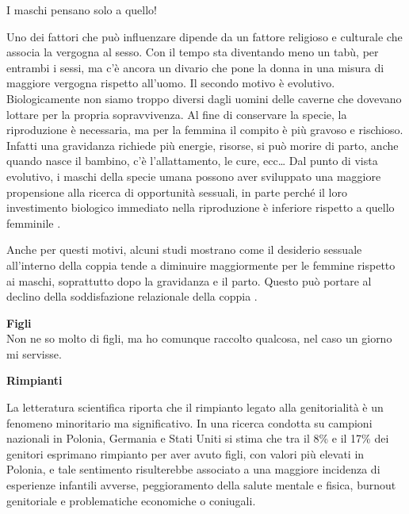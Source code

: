 \documentclass[12pt]{book} %
\begin{document}
\begin{mdframed}[linewidth=1pt]
I maschi pensano solo a quello!

Uno dei fattori che può influenzare dipende da un
fattore religioso e culturale che associa la vergogna al sesso. Con il tempo sta diventando meno un tabù, per entrambi i sessi, ma c'è ancora un divario che pone la donna in una misura di maggiore vergogna rispetto all'uomo. Il secondo motivo è evolutivo. Biologicamente
non siamo troppo diversi dagli uomini delle caverne che dovevano lottare per la propria sopravvivenza. Al fine di
conservare la specie, la riproduzione è necessaria, ma per la femmina il compito è più gravoso e rischioso. Infatti una gravidanza richiede più energie, risorse, si può morire di parto, anche quando nasce il
bambino, c'è l'allattamento, le cure, ecc… Dal punto di vista evolutivo, i maschi della specie umana possono aver sviluppato una maggiore propensione alla ricerca di opportunità sessuali, in parte perché il loro investimento biologico immediato nella riproduzione è inferiore rispetto a quello femminile
.

Anche per questi motivi, alcuni studi mostrano come il desiderio sessuale all'interno della coppia tende a diminuire
maggiormente per le femmine rispetto ai maschi, soprattutto dopo la gravidanza e il parto. Questo può portare al
declino della soddisfazione relazionale della coppia
.
\end{mdframed}

\noindent \textbf{\large Figli} \\
Non ne so molto di figli, ma ho comunque raccolto qualcosa, nel caso un giorno mi servisse.

\textbf{Rimpianti}

La letteratura scientifica riporta che il rimpianto legato alla genitorialità è un fenomeno minoritario ma significativo. In una ricerca condotta su campioni nazionali in Polonia, Germania e Stati Uniti si stima che tra il 8\% e il 17\% dei genitori esprimano rimpianto per aver avuto figli, con valori più elevati in Polonia, e tale sentimento risulterebbe associato a una maggiore incidenza di esperienze infantili avverse, peggioramento della salute mentale e fisica, burnout genitoriale e problematiche economiche o coniugali.
\end{document}
